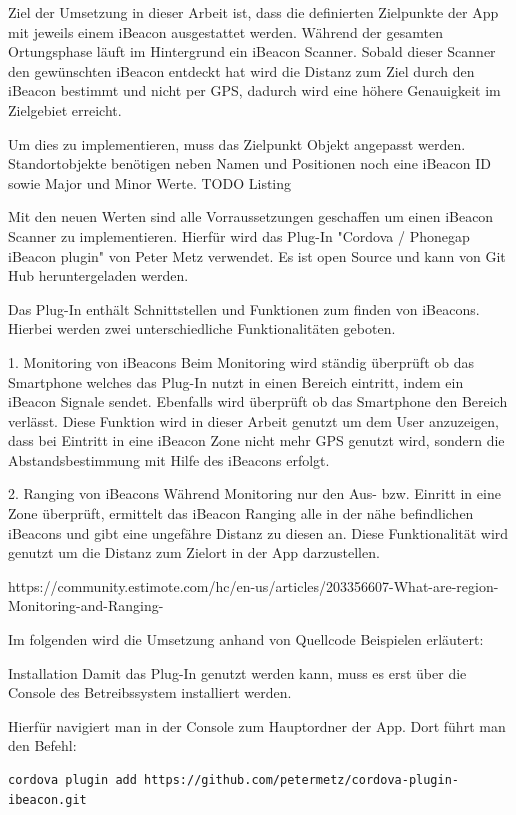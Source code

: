 Ziel der Umsetzung in dieser Arbeit ist, dass die definierten Zielpunkte der App mit jeweils einem iBeacon ausgestattet werden. Während der gesamten Ortungsphase läuft im Hintergrund ein iBeacon Scanner. Sobald dieser Scanner den gewünschten iBeacon entdeckt hat wird die Distanz zum Ziel durch den iBeacon bestimmt und nicht per GPS, dadurch wird eine höhere Genauigkeit im Zielgebiet erreicht.

Um dies zu implementieren, muss das Zielpunkt Objekt angepasst werden. Standortobjekte benötigen neben Namen und Positionen noch eine iBeacon ID sowie Major und Minor Werte. TODO Listing

Mit den neuen Werten sind alle Vorraussetzungen geschaffen um einen iBeacon Scanner zu implementieren. Hierfür wird das Plug-In "Cordova / Phonegap iBeacon plugin" von Peter Metz verwendet. Es ist open Source und kann von Git Hub heruntergeladen werden.

Das Plug-In enthält Schnittstellen und Funktionen zum finden von iBeacons. Hierbei werden zwei unterschiedliche Funktionalitäten geboten.


1. Monitoring von iBeacons
Beim Monitoring wird ständig überprüft ob das Smartphone welches das Plug-In nutzt in einen Bereich eintritt, indem ein iBeacon Signale sendet. Ebenfalls wird überprüft ob das Smartphone den Bereich verlässt. Diese Funktion wird in dieser Arbeit genutzt um dem User anzuzeigen, dass bei Eintritt in eine iBeacon Zone nicht mehr GPS genutzt wird, sondern die Abstandsbestimmung mit Hilfe des iBeacons erfolgt.

2. Ranging von iBeacons
Während Monitoring nur den Aus- bzw. Einritt in eine Zone überprüft, ermittelt das iBeacon Ranging alle in der nähe befindlichen iBeacons und gibt eine ungefähre Distanz zu diesen an. Diese Funktionalität wird genutzt um die Distanz zum Zielort in der App darzustellen.

https://community.estimote.com/hc/en-us/articles/203356607-What-are-region-Monitoring-and-Ranging-


Im folgenden wird die Umsetzung anhand von Quellcode Beispielen erläutert:

Installation
Damit das Plug-In genutzt werden kann, muss es erst über die Console des Betreibssystem installiert werden.

Hierfür navigiert man in der Console zum Hauptordner der App. Dort führt man den Befehl:

\begin{lstlisting}
cordova plugin add https://github.com/petermetz/cordova-plugin-ibeacon.git
\end{lstlisting} 



